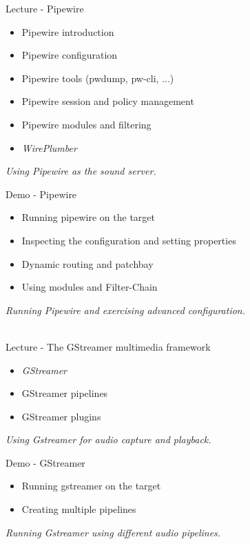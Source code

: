 \documentclass[a4paper,12pt,obeyspaces,spaces,hyphens]{article}
\begin{document}
\feagendatwocolumn
{Lecture - Pipewire}
{
  \begin{itemize}
  \item Pipewire introduction
  \item Pipewire configuration
  \item Pipewire tools (pwdump, pw-cli, ...)
  \item Pipewire session and policy management
  \item Pipewire modules and filtering
  \item {\em WirePlumber}
  \end{itemize}
  \vspace{0.5em}
  {\em Using Pipewire as the sound server.}
}
{Demo - Pipewire}
{
  \begin{itemize}
  \item Running pipewire on the target
  \item Inspecting the configuration and setting properties
  \item Dynamic routing and patchbay
  \item Using modules and Filter-Chain
  \end{itemize}
  \vspace{0.5em}
  {\em Running Pipewire and exercising advanced configuration.}
}
\\

\feagendatwocolumn
{Lecture - The GStreamer multimedia framework}
{
  \begin{itemize}
  \item {\em GStreamer}
  \item GStreamer pipelines
  \item GStreamer plugins
  \end{itemize}
  \vspace{0.5em}
  {\em Using Gstreamer for audio capture and playback.}
}
{Demo - GStreamer}
{
  \begin{itemize}
  \item Running gstreamer on the target
  \item Creating multiple pipelines
  \end{itemize}
  \vspace{0.5em}
  {\em Running Gstreamer using different audio pipelines.}
}
\end{document}
